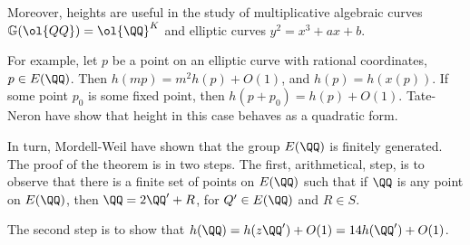 \documentclass[11pt]{scrartcl}
\begin{document}
Moreover, heights are useful in the study of multiplicative algebraic curves $\mathbb{G}(\ol{QQ}) =  \ol{\QQ}^K$ and elliptic curves $y^2 = x^3 + ax +b$.

For example, let $p$ be a point on an elliptic curve with rational
coordinates, $p\in E(\QQ)$. Then $h(mp) = m^2h(p) + O(1)$, and
$h(p) = h(x(p))$. If some point $p_0$ is some fixed point, then
$h(p+p_0) = h(p)+O(1)$. Tate-Neron have show that height in this case
behaves as a quadratic form.

In turn, Mordell-Weil have shown that the group $E(\QQ)$ is finitely
generated. The proof of the theorem is in two steps. The first,
arithmetical, step, is to observe that there is a finite set of points
on $E(\QQ)$ such that if $\QQ$ is any point on $E(\QQ)$, then
$\QQ = 2\QQ' + R$, for $Q' \in E(\QQ)$ and $R\in S$.

The second step is to show that $h(\QQ) = h(z\QQ') + O(1) = 14h(\QQ') + O(1)$.
\end{document}
